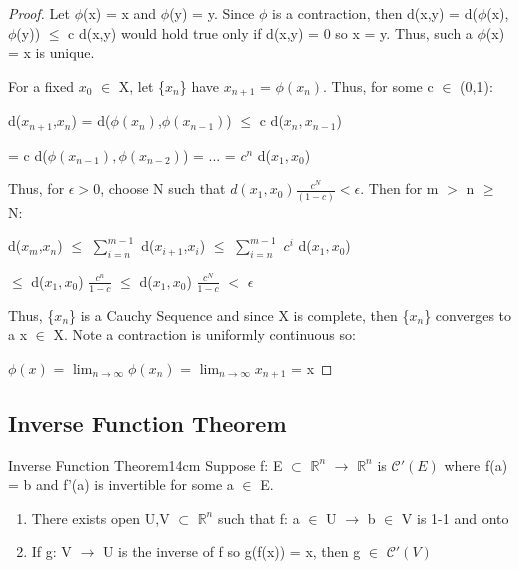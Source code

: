     \begin{proof}
        Let $\phi$(x) = x and $\phi$(y) = y. Since $\phi$ is a contraction,
        then d(x,y) = d($\phi$(x),$\phi$(y)) $\leq$ c d(x,y)
        would hold true only if d(x,y) = 0 so x = y.
        Thus, such a $\phi$(x) = x is unique.

        For a fixed $x_0$ $\in$ X, let \{$x_n$\} have
        $x_{n+1}$ = $\phi(x_n)$. Thus, for some c $\in$ (0,1):

        \hspace{0.5cm}
        d($x_{n+1}$,$x_n$)
        = d($\phi(x_n)$,$\phi(x_{n-1})$)
        $\leq$ c d($x_n,x_{n-1}$)

        \hspace{2.6cm}
        = c d($\phi(x_{n-1}),\phi(x_{n-2})$)
        = ...
        = $c^n$ d($x_1,x_0$)

        Thus, for $\epsilon > 0$, choose N such that
        $d(x_1,x_0)\frac{c^N}{(1-c)} < \epsilon$.
        Then for m $>$ n $\geq$ N:

        \hspace{0.5cm}
        d($x_{m}$,$x_n$)
        $\leq$ $\sum_{i=n}^{m-1}$ d($x_{i+1}$,$x_i$)
        $\leq$ $\sum_{i=n}^{m-1}$ $c^i$ d($x_1,x_0$)

        \hspace{2.25cm}
        $\leq$ d($x_1,x_0$) $\frac{c^n}{1-c}$
        $\leq$ d($x_1,x_0$) $\frac{c^N}{1-c}$
        $<$ $\epsilon$

        Thus, \{$x_n$\} is a Cauchy Sequence and since X is complete,
        then \{$x_n$\} converges to a x $\in$ X.
        Note a contraction is uniformly continuous so:

        \hspace{0.5cm}
        $\phi(x)$
        = $\lim_{n \rightarrow \infty} \phi(x_n)$
        = $\lim_{n \rightarrow \infty} x_{n+1}$
        = x
    \end{proof}

    \vspace{0.5cm}



\subsection{ Inverse Function Theorem }

    \begin{wtheorem}{Inverse Function Theorem}{14cm}
        Suppose f: E $\subset$ $\mathbb{R}^n$ $\rightarrow$ $\mathbb{R}^n$
        is $\mathscr{C}'(E)$ where f(a) = b and
        f'(a) is invertible for some a $\in$ E.

        \begin{enumerate}[label=(\alph*), leftmargin=1cm, itemsep=0.1cm]
            \item There exists open U,V $\subset$ $\mathbb{R}^n$ such that
                f: a $\in$ U $\rightarrow$ b $\in$ V is 1-1 and onto

            \item If g: V $\rightarrow$ U is the inverse of f so g(f(x)) = x,
                then g $\in$ $\mathscr{C}'(V)$
        \end{enumerate}
    \end{wtheorem}

